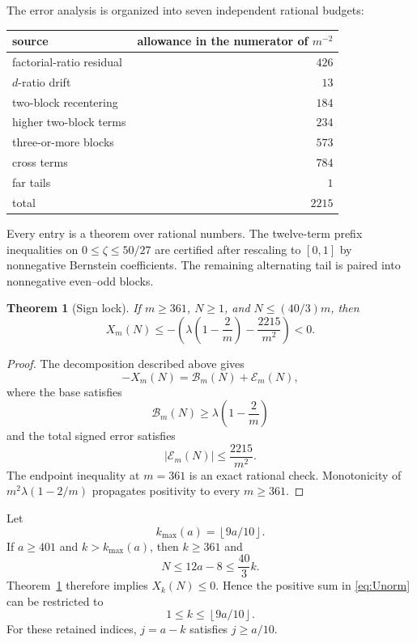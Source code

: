 \documentclass[11pt]{article}
\newtheorem{theorem}{Theorem}[section]
\theoremstyle{definition}
\theoremstyle{remark}
\newcommand{\floor}[1]{\left\lfloor #1\right\rfloor}
\newcommand{\abs}[1]{\left|#1\right|}
\begin{document}
The error analysis is organized into seven independent rational budgets:
\begin{center}
\begin{tabular}{lr}
\toprule
source & allowance in the numerator of $m^{-2}$\\
\midrule
factorial-ratio residual & $426$\\
$d$-ratio drift & $13$\\
two-block recentering & $184$\\
higher two-block terms & $234$\\
three-or-more blocks & $573$\\
cross terms & $784$\\
far tails & $1$\\
\midrule
total & $2215$\\
\bottomrule
\end{tabular}
\end{center}
Every entry is a theorem over rational numbers.  The twelve-term prefix
inequalities on $0\le\zeta\le50/27$ are certified after rescaling to
$[0,1]$ by nonnegative Bernstein coefficients.  The remaining alternating
tail is paired into nonnegative even--odd blocks.

\begin{theorem}[Sign lock]\label{thm:signlock}
If $m\ge361$, $N\ge1$, and $N\le(40/3)m$, then
\begin{equation}\label{eq:signlock}
 X_m(N)\le-
 \left(\lambda\left(1-\frac2m\right)-\frac{2215}{m^2}\right)<0.
\end{equation}
\end{theorem}

\begin{proof}
The decomposition described above gives
\[
 -X_m(N)=\mathcal B_m(N)+\mathcal E_m(N),
\]
where the base satisfies
\[
 \mathcal B_m(N)\ge\lambda\left(1-\frac2m\right)
\]
and the total signed error satisfies
\[
 \abs{\mathcal E_m(N)}\le\frac{2215}{m^2}.
\]
The endpoint inequality at $m=361$ is an exact rational check.  Monotonicity
of $m^2\lambda(1-2/m)$ propagates positivity to every $m\ge361$.
\end{proof}

Let
\[
  k_{\max}(a)=\floor{9a/10}.
\]
If $a\ge401$ and $k>k_{\max}(a)$, then $k\ge361$ and
\[
  N\le12a-8\le\frac{40}{3}k.
\]
Theorem~\ref{thm:signlock} therefore implies $X_k(N)\le0$.  Hence the
positive sum in \eqref{eq:Unorm} can be restricted to
\begin{equation}\label{eq:retained}
  1\le k\le\floor{9a/10}.
\end{equation}
For these retained indices, $j=a-k$ satisfies $j\ge a/10$.
\end{document}
